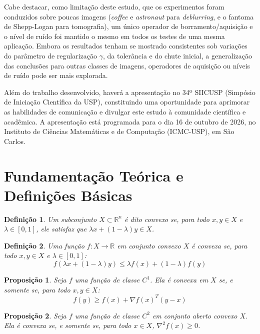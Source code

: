 \documentclass[12pt]{article}
\newtheorem{definition}{Definição}
\newtheorem{proposition}{Proposição}
\begin{document}
Cabe destacar, como limitação deste estudo, que os experimentos foram conduzidos sobre poucas imagens (\textit{coffee} e \textit{astronaut} para \textit{deblurring}, e o fantoma de Shepp-Logan para tomografia), um único operador de borramento/aquisição e o nível de ruído foi mantido o mesmo em todos os testes de uma mesma aplicação. Embora os resultados tenham se mostrado consistentes sob variações do parâmetro de regularização $\gamma$, da tolerância e do chute inicial, a generalização das conclusões para outras classes de imagens, operadores de aquisição ou níveis de ruído pode ser mais explorada.

Além do trabalho desenvolvido, haverá a apresentação no 34º SIICUSP (Simpósio de Iniciação Científica da USP), constituindo uma oportunidade para aprimorar as habilidades de comunicação e divulgar este estudo à comunidade científica e acadêmica. A apresentação está programada para o dia 16 de outubro de 2026, no Instituto de Ciências Matemáticas e de Computação (ICMC-USP), em São Carlos.

\printbibliography
\nocite{*}

\appendix

\section{Fundamentação Teórica e Definições Básicas}
\label{sec:fundamentacao_apendice}

\begin{definition}
Um subconjunto $X \subset \mathbb{R}^n$ é dito convexo se, para todo $x, y \in X$ e $\lambda \in [0,1]$, ele satisfaz que $\lambda x + ( 1 - \lambda ) y \in X$.
\end{definition}

\begin{definition}
Uma função $f : X \to \mathbb{R}$ em conjunto convexo $X$ é convexa se, para todo $x,y \in X$ e $\lambda \in [0,1]$:
\[
f(\lambda x + ( 1-\lambda ) y ) \leq \lambda f(x) + ( 1 - \lambda )f(y)
\]
\end{definition}

\begin{proposition}
Seja $f$ uma função de classe $C^1$. Ela é convexa em $X$ se, e somente se, para todo $x,y \in X$:
\[
f(y) \geq f(x) + \nabla f(x)^T(y-x)
\]
\end{proposition}

\begin{proposition}
Seja $f$ uma função de classe $C^2$ em conjunto aberto convexo $X$. Ela é convexa se, e somente se, para todo $x \in X$, $\nabla^2 f(x) \geq 0$.
\end{proposition}
\end{document}
